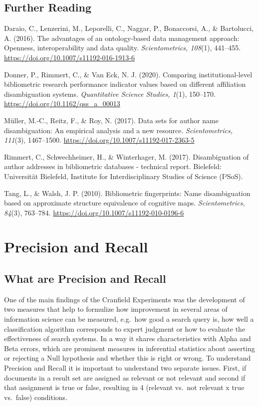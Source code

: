 \documentclass[
  letterpaper,
]{scrreprt}
\begin{document}
\section{Further Reading}\label{further-reading-3}

Daraio, C., Lenzerini, M., Leporelli, C., Naggar, P., Bonaccorsi, A., \&
Bartolucci, A. (2016). The advantages of an ontology-based data
management approach: Openness, interoperability and data quality.
\emph{Scientometrics, 108}(1), 441--455.
\url{https://doi.org/10.1007/s11192-016-1913-6}

Donner, P., Rimmert, C., \& Van Eck, N. J. (2020). Comparing
institutional-level bibliometric research performance indicator values
based on different affiliation disambiguation systems.
\emph{Quantitative Science Studies, 1}(1), 150--170.
\url{https://doi.org/10.1162/qss_a_00013}

Müller, M.-C., Reitz, F., \& Roy, N. (2017). Data sets for author name
disambiguation: An empirical analysis and a new resource.
\emph{Scientometrics, 111}(3), 1467--1500.
\url{https://doi.org/10.1007/s11192-017-2363-5}

Rimmert, C., Schwechheimer, H., \& Winterhager, M. (2017).
Disambiguation of author addresses in bibliometric databases - technical
report. Bielefeld: Universität Bielefeld, Institute for
Interdisciplinary Studies of Science (I²SoS).

Tang, L., \& Walsh, J. P. (2010). Bibliometric fingerprints: Name
disambiguation based on approximate structure equivalence of cognitive
maps. \emph{Scientometrics, 84}(3), 763--784.
\url{https://doi.org/10.1007/s11192-010-0196-6}

\chapter{Precision and Recall}\label{precision-and-recall}

\section{What are Precision and
Recall}\label{what-are-precision-and-recall}

One of the main findings of the Cranfield Experiments was the
development of two measures that help to formulize how improvement in
several areas of information science can be measured, e.g.~how good a
search query is, how well a classification algorithm corresponds to
expert judgment or how to evaluate the effectiveness of search systems.
In a way it shares characteristics with Alpha and Beta errors, which are
prominent measures in inferential statistics about asserting or
rejecting a Null hypothesis and whether this is right or wrong. To
understand Precision and Recall it is important to understand two
separate issues. First, if documents in a result set are assigned as
relevant or not relevant and second if that assignment is true or false,
resulting in 4 (relevant vs.~not relevant x true vs.~false) conditions.
\end{document}
